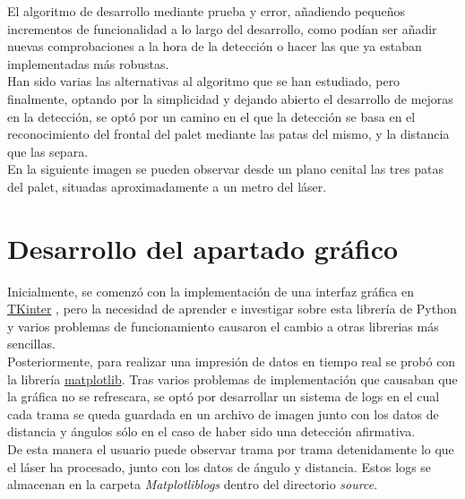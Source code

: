 		El algoritmo de desarrollo mediante prueba y error, añadiendo pequeños incrementos de funcionalidad a lo largo del desarrollo, como podían ser añadir nuevas comprobaciones a la hora de la detección o hacer las que ya estaban implementadas más robustas.\\

		Han sido varias las alternativas al algoritmo que se han estudiado, pero finalmente, optando por la simplicidad y dejando abierto el desarrollo de mejoras en la detección, se optó por un camino en el que la detección se basa en el reconocimiento del frontal del palet mediante las patas del mismo, y la distancia que las separa.\\
En la siguiente imagen se pueden observar desde un plano cenital las tres patas del palet, situadas aproximadamente a un metro del láser.




\section{Desarrollo del apartado gráfico}

		Inicialmente, se comenzó con la implementación de una interfaz gráfica en \href{https://docs.python.org/2/library/tkinter.html}{TKinter}
, pero la necesidad de aprender e investigar sobre esta librería de Python y varios problemas de funcionamiento causaron el cambio a otras librerias más sencillas.\\
Posteriormente, para realizar una impresión de datos en tiempo real se probó con la librería \href{https://matplotlib.org/}{matplotlib}. Tras varios problemas de implementación que causaban que la gráfica no se refrescara, se optó por desarrollar un sistema de logs en el cual cada trama se queda guardada en un archivo de imagen junto con los datos de distancia y ángulos sólo en el caso de haber sido una detección afirmativa.\\ De esta manera el usuario puede observar trama por trama detenidamente lo que el láser ha procesado, junto con los datos de ángulo y distancia. Estos logs se almacenan en la carpeta \textit{Matplotlib\textunderscore logs} dentro del directorio \textit{source}.







